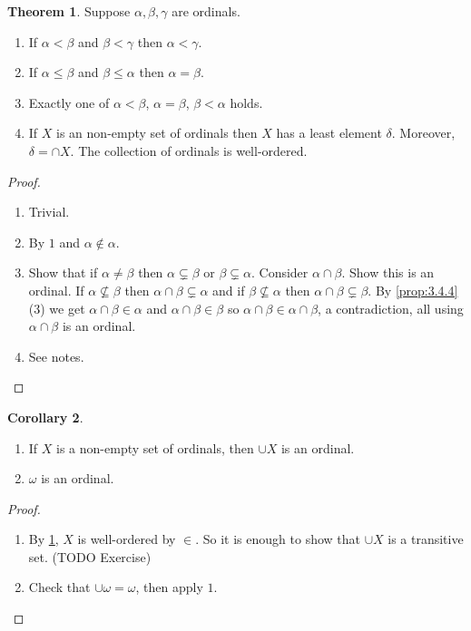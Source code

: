 \documentclass{article}
\theoremstyle{definition}\newtheorem{definition}{Definition}[subsection]
\theoremstyle{definition}\newtheorem{remark}[definition]{Remark}
\theoremstyle{definition}\newtheorem*{example}{Example}
\theoremstyle{definition}\newtheorem*{note}{Note}
\newtheorem{theorem}[definition]{Theorem}
\newtheorem{corollary}[definition]{Corollary}
\begin{document}
\begin{theorem}
\label{thm:3.4.6}
Suppose $ \alpha, \beta, \gamma $ are ordinals.
\begin{enumerate}
\item If $ \alpha < \beta $ and $ \beta < \gamma $ then $ \alpha < \gamma $.
\item If $ \alpha \le \beta $ and $ \beta \le \alpha $ then $ \alpha = \beta $.
\item Exactly one of $ \alpha < \beta $, $ \alpha = \beta $, $ \beta < \alpha $ holds.
\item If $ X $ is an non-empty set of ordinals then $ X $ has a least element $ \delta $. Moreover, $ \delta = \cap X $. The collection of ordinals is well-ordered.
\end{enumerate}
\end{theorem}

\begin{proof}
\hfill
\begin{enumerate}
\item Trivial.
\item By $ 1 $ and $ \alpha \notin \alpha $.
\item Show that if $ \alpha \ne \beta $ then $ \alpha \subsetneq \beta $ or $ \beta \subsetneq \alpha $. Consider $ \alpha \cap \beta $. Show this is an ordinal. If $ \alpha \nsubseteq \beta $ then $ \alpha \cap \beta \subsetneq \alpha $ and if $ \beta \nsubseteq \alpha $ then $ \alpha \cap \beta \subsetneq \beta $. By \ref{prop:3.4.4}(3) we get $ \alpha \cap \beta \in \alpha $ and $ \alpha \cap \beta \in \beta $ so $ \alpha \cap \beta \in \alpha \cap \beta $, a contradiction, all using $ \alpha \cap \beta $ is an ordinal.
\item See notes.
\end{enumerate}
\end{proof}

\begin{corollary}
\hfill
\begin{enumerate}
\item If $ X $ is a non-empty set of ordinals, then $ \cup X $ is an ordinal.
\item $ \omega $ is an ordinal.
\end{enumerate}
\end{corollary}

\begin{proof}
\hfill
\begin{enumerate}
\item By \ref{thm:3.4.6}, $ X $ is well-ordered by $ \in $. So it is enough to show that $ \cup X $ is a transitive set. (TODO Exercise)
\item Check that $ \cup \omega = \omega $, then apply $ 1 $.
\end{enumerate}
\end{proof}
\end{document}
